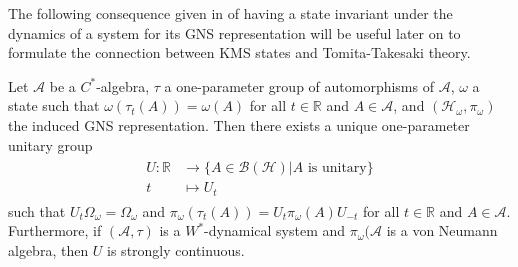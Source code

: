 The following consequence given in \cite{Duvenhage1999} of having a state invariant under the dynamics of a system for its GNS representation will be useful later on to formulate the connection between KMS states and Tomita-Takesaki theory.

\begin{theorem}
Let $\mathcal{A}$ be a $C^*$-algebra, $\tau$ a one-parameter group of automorphisms of $\mathcal{A}$, $\omega$ a state such that $\omega(\tau_t(A))=\omega(A)$ for all $t\in\mathbb{R}$ and $A\in\mathcal{A}$, and $(\mathcal{H}_\omega,\pi_\omega)$ the induced GNS representation. Then there exists a unique one-parameter unitary group
\begin{align}
\begin{split}
U:\mathbb{R}&\rightarrow\{A\in\mathcal{B}(\mathcal{H})|A\text{ is unitary}\} \\
t&\mapsto U_t
\end{split}
\end{align}
such that $U_t\Omega_\omega=\Omega_\omega$ and $\pi_\omega(\tau_t(A))=U_t\pi_\omega(A)U_{-t}$ for all $t\in\mathbb{R}$ and $A\in\mathcal{A}$. Furthermore, if $(\mathcal{A},\tau)$ is a $W^*$-dynamical system and $\pi_\omega(\mathcal{A}$ is a von Neumann algebra, then $U$ is strongly continuous.
\end{theorem} 